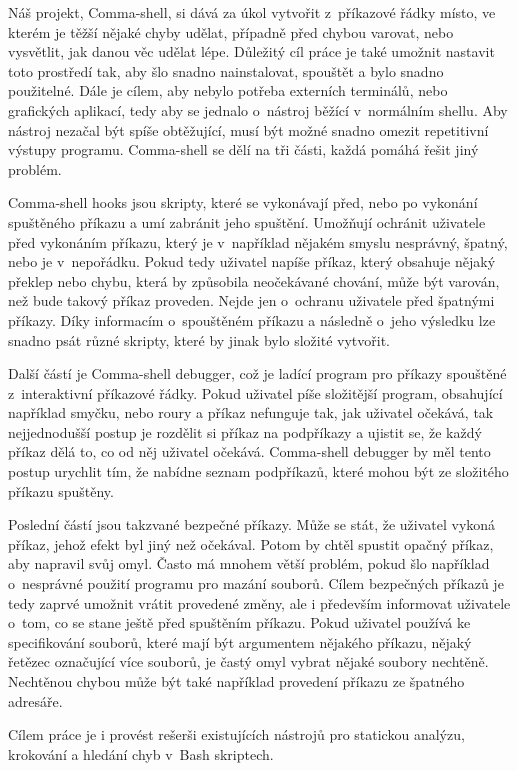 \documentclass[thesis=M,czech]{FITthesis}[2012/06/26]
\begin{document}
\begin{introduction}
Náš projekt, Comma-shell, si dává za úkol vytvořit z~příkazové řádky místo, ve kterém je těžší nějaké chyby udělat, případně před chybou varovat, nebo vysvětlit, jak danou věc udělat lépe. Důležitý cíl práce je také umožnit nastavit toto prostředí tak, aby šlo snadno nainstalovat, spouštět a bylo snadno použitelné. Dále je cílem, aby nebylo potřeba externích terminálů, nebo grafických aplikací, tedy aby se jednalo o~nástroj běžící v~normálním shellu. Aby nástroj nezačal být spíše obtěžující, musí být možné snadno omezit repetitivní výstupy programu. Comma-shell se dělí na tři části, každá pomáhá řešit jiný problém.

Comma-shell hooks jsou skripty, které se vykonávají před, nebo po vykonání spuštěného příkazu a umí zabránit jeho spuštění. Umožňují ochránit uživatele před vykonáním příkazu, který je v~například nějakém smyslu nesprávný, špatný, nebo je v~nepořádku. Pokud tedy  uživatel napíše příkaz, který obsahuje nějaký překlep nebo chybu, která by způsobila neočekávané chování, může být varován, než bude takový příkaz proveden. Nejde jen o~ochranu uživatele před špatnými příkazy. Díky informacím o~spouštěném příkazu a následně o~jeho výsledku lze snadno psát různé skripty, které by jinak bylo složité vytvořit.

Další částí je Comma-shell debugger, což je ladící program pro příkazy spouštěné z~interaktivní příkazové řádky. Pokud uživatel píše složitější program, obsahující například smyčku, nebo roury a příkaz nefunguje tak, jak uživatel očekává, tak nejjednodušší postup je rozdělit si příkaz na podpříkazy a ujistit se, že každý příkaz dělá to, co od něj uživatel očekává. Comma-shell debugger by měl tento postup urychlit tím, že nabídne seznam podpříkazů, které mohou být ze složitého příkazu spuštěny.

Poslední částí jsou takzvané bezpečné příkazy. Může se stát, že uživatel vykoná příkaz, jehož efekt byl jiný než očekával. Potom by chtěl spustit opačný příkaz, aby napravil svůj omyl. Často má mnohem větší problém, pokud šlo například o~nesprávné použití programu pro mazání souborů. Cílem bezpečných příkazů je tedy zaprvé umožnit vrátit provedené změny, ale i především informovat uživatele o~tom, co se stane ještě před spuštěním příkazu. Pokud uživatel používá ke specifikování souborů, které mají být argumentem nějakého příkazu, nějaký řetězec označující více souborů, je častý omyl vybrat nějaké soubory nechtěně. Nechtěnou chybou může být také například provedení příkazu ze špatného adresáře.

Cílem práce je i provést rešerši existujících nástrojů pro statickou analýzu, krokování a hledání chyb v~Bash skriptech.


\end{introduction}
\end{document}
